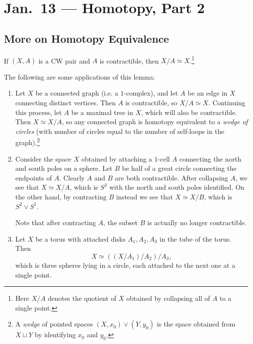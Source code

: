 \chapter{Jan.~13 --- Homotopy, Part 2}

\section{More on Homotopy Equivalence}
\begin{lemma}\label{lem:lemma-2}
  If $(X, A)$ is a CW pair and $A$ is contractible,
  then $X / A \simeq X$.\footnote{Here $X / A$ denotes
  the quotient of $X$ obtained by collapsing all of $A$
  to a single point.}
\end{lemma}

\begin{exercise}
  The following are some applications of this lemma:
  \begin{enumerate}
    \item Let $X$ be a connected graph (i.e. a
      $1$-complex), and let $A$ be an edge in $X$
      connecting distinct vertices. Then $A$ is
      contractible, so $X / A \simeq X$.
      Continuing this process, let $A$ be a maximal
      tree in $X$, which will also be contractible.
      Then $X \simeq X / A$, so any connected graph is
      homotopy equivalent to a \emph{wedge of circles}
      (with number of circles equal to the number of
      self-loops in the graph).\footnote{A \emph{wedge} of pointed spaces $(X, x_0) \lor (Y, y_0)$ is the space obtained from $X \sqcup Y$ by identifying $x_0$ and $y_0$.}
    \item Consider the space $X$ obtained by attaching
      a $1$-cell $A$ connecting the north and south
      poles on a sphere. Let $B$ be half of a great
      circle
      connecting the endpoints of $A$. Clearly $A$ and
      $B$ are both contractible. After collapsing
      $A$, we see that $X \simeq X / A$, which is
      $S^2$ with the north and south poles identified.
      On the other hand, by contracting $B$ instead
      we see that $X \simeq X / B$, which is
      $S^2 \lor S^1$.

      Note that after contracting $A$,
      the subset $B$ is actually no longer contractible.
    \item Let $X$ be a torus with attached disks
      $A_1, A_2, A_3$ in the tube of the torus.
      Then
      \[X \simeq ((X / A_1) / A_2) / A_3,\]
      which is three spheres lying in a circle, each
      attached to the next one at a single point.


\end{enumerate}
\end{exercise}
